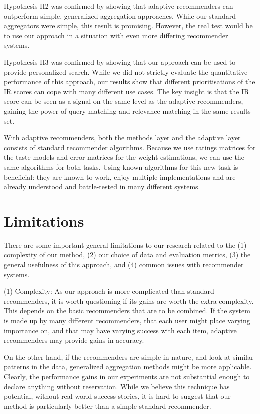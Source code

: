 Hypothesis H2 was confirmed by showing that adaptive recommenders
can outperform simple, generalized aggregation approaches.
While our standard aggregators were simple,
this result is promising.
However, the real test would be to use our approach
in a situation with even more differing recommender systems.

Hypothesis H3 was confirmed by showing that our approach
can be used to provide personalized search.
While we did not strictly evaluate the quantitative performance
of this approach, our results show that different
prioritisations of the IR scores can cope with many different use cases.
The key insight is that the IR score can be seen as a signal
on the same level as the adaptive recommenders,
gaining the power of query matching and relevance matching
in the same results set.

With adaptive recommenders, both the methods layer and the adaptive layer consists of standard recommender algorithms.
Because we use ratings matrices for the taste models and error matrices for the weight estimations,
we can use the same algorithms for both tasks.
Using known algorithms for this new task is beneficial:
they are known to work, enjoy multiple implementations
and are already understood and battle-tested in many different systems.


\section{Limitations}

There are some important general limitations to our research
related to the 
(1) complexity of our method, 
(2) our choice of data and evaluation metrics, 
(3) the general usefulness of this approach, and
(4) common issues with recommender systems.

(1) Complexity: As our approach is more complicated than standard recommenders,
it is worth questioning if its gains are worth the extra complexity.
This depends on the basic recommenders that are to be combined.
If the system is made up by many different recommenders,
that each user might place varying importance on,
and that may have varying success with each item,
adaptive recommenders may provide gains in accuracy.

On the other hand, if the recommenders are simple in nature,
and look at similar patterns in the data,
generalized aggregation methods might be more applicable.
Clearly, the performance gains in our experiments
are not substantial enough to declare anything without reservation.
While we believe this technique has potential,
without real-world success stories, it is hard
to suggest that our method is particularly better
than a simple standard recommender.

